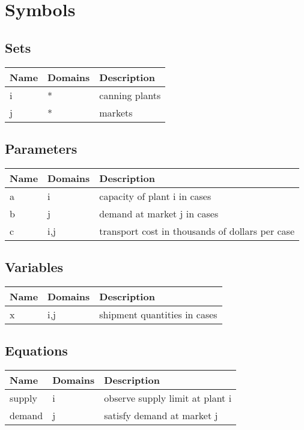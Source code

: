 \documentclass[11pt]{article}
\begin{document}
\section*{Symbols}


\subsection*{Sets}
\begin{tabularx}{\textwidth}{| l | l | X |}
\hline
\textbf{Name} & \textbf{Domains} & \textbf{Description}\\
\hline
\endhead

i & * & canning plants\\
j & * & markets\\
\hline
\end{tabularx}
\subsection*{Parameters}
\begin{tabularx}{\textwidth}{| l | l | X |}
\hline
\textbf{Name} & \textbf{Domains} & \textbf{Description}\\
\hline
\endhead

a & i & capacity of plant i in cases\\
b & j & demand at market j in cases\\
c & i,j & transport cost in thousands of dollars per case\\
\hline
\end{tabularx}
\subsection*{Variables}
\begin{tabularx}{\textwidth}{| l | l | X |}
\hline
\textbf{Name} & \textbf{Domains} & \textbf{Description}\\
\hline
\endhead

x & i,j & shipment quantities in cases\\
\hline
\end{tabularx}
\subsection*{Equations}
\begin{tabularx}{\textwidth}{| l | l | X |}
\hline
\textbf{Name} & \textbf{Domains} & \textbf{Description}\\
\hline
\endhead

supply & i & observe supply limit at plant i\\
demand & j & satisfy demand at market j\\
\hline
\end{tabularx}
\end{document}
